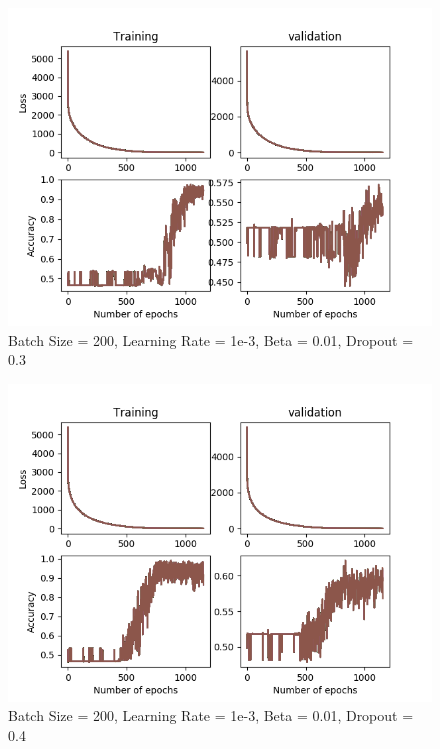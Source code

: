 \documentclass[12pt,reqno]{amsart}
\numberwithin{equation}{section}
\begin{document}
\begin{enumerate}
\begin{figure}[H]
\centering
\includegraphics[scale=0.6]{data12-1e-3-200-1e-2-3e-1}
\caption{Batch Size = 200, Learning Rate = 1e-3, Beta = 0.01, Dropout = 0.3}
\end{figure}

\begin{figure}[H]
\centering
\includegraphics[scale=0.6]{data12-1e-3-200-1e-2-4e-1}
\caption{Batch Size = 200, Learning Rate = 1e-3, Beta = 0.01, Dropout = 0.4}
\end{figure}


\end{enumerate}
\end{document}
